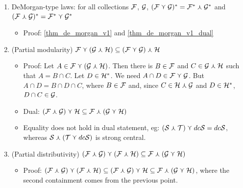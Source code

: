 \begin{enumerate}
    \item DeMorgan-type laws: for all collections $\mathcal{F}$, $\mathcal{G}$, $(\mathcal{F} \curlyvee \mathcal{G})^* = \mathcal{F}^* \curlywedge \mathcal{G}^*$ and $(\mathcal{F} \curlywedge \mathcal{G})^* = \mathcal{F}^* \curlyvee \mathcal{G}^*$
    \begin{itemize}
        \item Proof: \cref{thm_de_morgan_v1} and \cref{thm_de_morgan_v1_dual}
    \end{itemize}

    \item (Partial modularity) $\mathcal{F} \curlyvee (\mathcal{G} \curlywedge \mathcal{H}) \subseteq (\mathcal{F} \curlyvee \mathcal{G}) \curlywedge \mathcal{H}$
    \begin{itemize}
        \item Proof: Let $A \in \mathcal{F} \curlyvee (\mathcal{G} \curlywedge \mathcal{H})$.  Then there is $B \in \mathcal{F}$ and $C \in \mathcal{G} \curlywedge \mathcal{H}$ such that $A = B \cap C$.  Let $D \in \mathcal{H}^*$.  We need $A \cap D \in \mathcal{F} \curlyvee \mathcal{G}$.  But $A \cap D = B \cap D \cap C$, where $B \in \mathcal{F}$ and, since $C \in \mathcal{H} \curlywedge \mathcal{G}$ and $D \in \mathcal{H}^*$, $D \cap C \in \mathcal{G}$.

        \item Dual: $(\mathcal{F} \curlywedge \mathcal{G}) \curlyvee \mathcal{H} \subseteq \mathcal{F} \curlywedge (\mathcal{G} \curlyvee \mathcal{H})$

        \item Equality does not hold in dual statement, eg: $(\mathcal{S} \curlywedge \mathcal{T}) \curlyvee dc\mathcal{S} = dc\mathcal{S}$, whereas $\mathcal{S} \curlywedge (\mathcal{T} \curlyvee dc\mathcal{S})$ is strong central.
    \end{itemize}

    \item (Partial distributivity) $(\mathcal{F} \curlywedge \mathcal{G}) \curlyvee (\mathcal{F} \curlywedge \mathcal{H}) \subseteq \mathcal{F} \curlywedge (\mathcal{G} \curlyvee \mathcal{H})$
    \begin{itemize}
        \item Proof: $(\mathcal{F} \curlywedge \mathcal{G}) \curlyvee (\mathcal{F} \curlywedge \mathcal{H}) \subseteq (\mathcal{F} \curlywedge \mathcal{G}) \curlyvee \mathcal{H} \subseteq \mathcal{F} \curlywedge (\mathcal{G} \curlyvee \mathcal{H})$, where the second containment comes from the previous point.


\end{itemize}
\end{enumerate}
